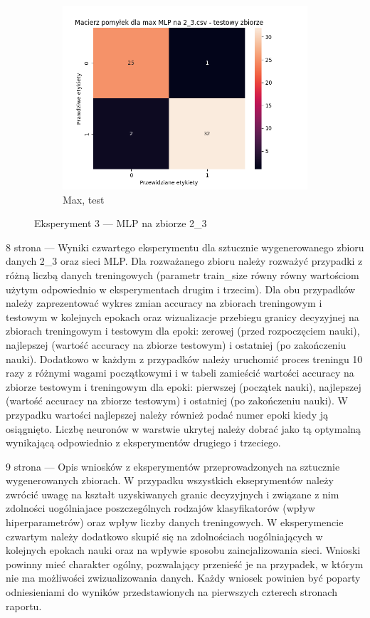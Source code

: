\documentclass[12pt]{article}
\newcommand*{\subfigwidth}{0.24\textwidth}
\begin{document}
\begin{figure}[H]
\begin{subfigure}[t]{\subfigwidth}
        \includegraphics[width=\linewidth]{img/exp_3/mlp/2_3/max/test_matrix.png}
        \caption{Max, test}
    \end{subfigure}

    \caption{Eksperyment 3 --- MLP na zbiorze 2\_3}
\end{figure}
\clearpage

8 strona --- Wyniki czwartego eksperymentu dla sztucznie wygenerowanego zbioru danych 2\_3 oraz sieci MLP. Dla rozważanego zbioru należy rozważyć przypadki z różną liczbą danych treningowych (parametr train\_size równy równy wartościom użytym odpowiednio w eksperymentach drugim i trzecim). Dla obu przypadków należy zaprezentować wykres zmian accuracy na zbiorach treningowym i testowym w kolejnych epokach oraz wizualizacje przebiegu granicy decyzyjnej na zbiorach treningowym i testowym dla epoki: zerowej (przed rozpoczęciem nauki), najlepszej (wartość accuracy na zbiorze testowym) i ostatniej (po zakończeniu nauki).
Dodatkowo w każdym z przypadków należy uruchomić proces treningu 10 razy z różnymi wagami początkowymi i w tabeli zamieścić wartości accuracy na zbiorze testowym i treningowym dla epoki: pierwszej (początek nauki), najlepszej (wartość accuracy na zbiorze testowym) i ostatniej (po zakończeniu nauki). W przypadku wartości najlepszej należy również podać numer epoki kiedy ją osiągnięto. Liczbę neuronów w warstwie ukrytej należy dobrać jako tą optymalną wynikającą odpowiednio z eksperymentów drugiego i trzeciego.

\clearpage

9 strona --- Opis wniosków z eksperymentów przeprowadzonych na sztucznie wygenerowanych zbiorach.
W przypadku wszystkich ekseprymentów należy zwrócić uwagę na kształt uzyskiwanych granic decyzyjnych 
i związane z nim zdolności uogólniajace poszczególnych rodzajów klasyfikatorów (wpływ hiperparametrów) 
oraz wpływ liczby danych treningowych. W eksperymencie czwartym należy dodatkowo skupić się na zdolnościach 
uogólniających w kolejnych epokach nauki oraz na wpływie sposobu zaincjalizowania sieci.
Wnioski powinny mieć charakter ogólny, pozwalający przenieść je na przypadek, w którym nie ma możliwości
zwizualizowania danych. Każdy wniosek powinien być poparty odniesieniami do wyników przedstawionych 
na pierwszych czterech stronach raportu.
\end{document}
